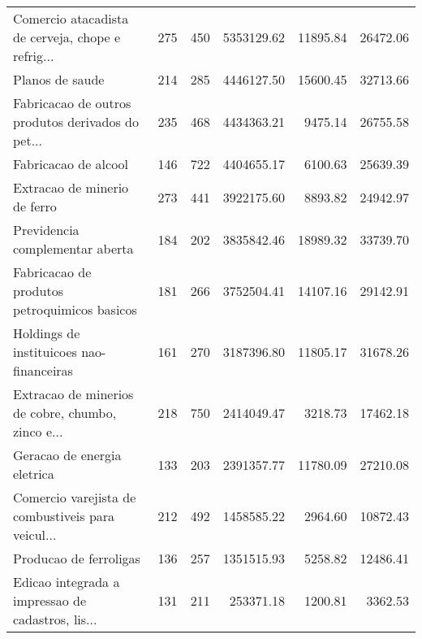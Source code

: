 \begin{tabular}{lrrrrr}
 Comercio atacadista de cerveja, chope e refrig... &                   275 &                  450 &  5353129.62 &   11895.84 &                 26472.06 \\
                                   Planos de saude &                   214 &                  285 &  4446127.50 &   15600.45 &                 32713.66 \\
 Fabricacao de outros produtos derivados do pet... &                   235 &                  468 &  4434363.21 &    9475.14 &                 26755.58 \\
                              Fabricacao de alcool &                   146 &                  722 &  4404655.17 &    6100.63 &                 25639.39 \\
                      Extracao de minerio de ferro &                   273 &                  441 &  3922175.60 &    8893.82 &                 24942.97 \\
                   Previdencia complementar aberta &                   184 &                  202 &  3835842.46 &   18989.32 &                 33739.70 \\
      Fabricacao de produtos petroquimicos basicos &                   181 &                  266 &  3752504.41 &   14107.16 &                 29142.91 \\
          Holdings de instituicoes nao-financeiras &                   161 &                  270 &  3187396.80 &   11805.17 &                 31678.26 \\
 Extracao de minerios de cobre, chumbo, zinco e... &                   218 &                  750 &  2414049.47 &    3218.73 &                 17462.18 \\
                       Geracao de energia eletrica &                   133 &                  203 &  2391357.77 &   11780.09 &                 27210.08 \\
 Comercio varejista de combustiveis para veicul... &                   212 &                  492 &  1458585.22 &    2964.60 &                 10872.43 \\
                            Producao de ferroligas &                   136 &                  257 &  1351515.93 &    5258.82 &                 12486.41 \\
 Edicao integrada a impressao de cadastros, lis... &                   131 &                  211 &   253371.18 &    1200.81 &                  3362.53 \\
\bottomrule
\end{tabular}
